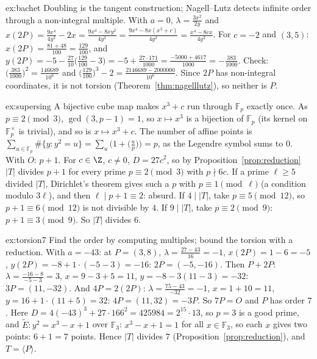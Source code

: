 \begin{solution}{ex:bachet}
\idea Doubling is the tangent construction; Nagell--Lutz detects infinite order through a non-integral multiple.
\writeup With $a=0$, $\lambda=\frac{3x^2}{2y}$ and $x(2P)=\frac{9x^4}{4y^2}-2x=\frac{9x^4-8xy^2}{4y^2}=\frac{9x^4-8x(x^3+c)}{4y^2}=\frac{x^4-8cx}{4y^2}$. For $c=-2$ and $(3,5)$:
$x(2P)=\frac{81+48}{100}=\frac{129}{100}$, and $y(2P)=-5-\frac{27}{10}\bigl(\frac{129}{100}-3\bigr)=-5+\frac{27\cdot171}{1000}=\frac{-5000+4617}{1000}=-\frac{383}{1000}$. Check:
$\bigl(\frac{383}{1000}\bigr)^2=\frac{146689}{10^6}$ and $\bigl(\frac{129}{100}\bigr)^3-2=\frac{2146689-2000000}{10^6}$. Since $2P$ has non-integral coordinates, it is not torsion
(Theorem~\ref{thm:nagelllutz}), so neither is $P$.
\end{solution}

\begin{solution}{ex:supersing}
\idea A bijective cube map makes $x^3+c$ run through $\mathbb F_p$ exactly once.
\writeup As $p\equiv2\pmod3$, $\gcd(3,p-1)=1$, so $x\mapsto x^3$ is a bijection of $\mathbb F_p$ (its kernel on $\mathbb F_p^\times$ is trivial), and so is $x\mapsto x^3+c$.
The number of affine points is $\sum_{u\in\mathbb F_p}\#\{y:y^2=u\}=\sum_u\bigl(1+\bigl(\frac up\bigr)\bigr)=p$, as the Legendre symbol sums to $0$. With $O$: $p+1$. For
$c\in\Z$, $c\ne0$, $D=27c^2$, so by Proposition~\ref{prop:reduction} $|T|$ divides $p+1$ for every prime $p\equiv2\pmod3$ with $p\nmid6c$. If a prime $\ell\ge5$ divided $|T|$, Dirichlet's theorem gives such a
$p$ with $p\equiv1\pmod\ell$ (a condition modulo $3\ell$), and then $\ell\mid p+1\equiv2$: absurd. If $4\mid|T|$, take $p\equiv5\pmod{12}$, so $p+1\equiv6\pmod{12}$ is not divisible by $4$. If $9\mid|T|$, take $p\equiv2\pmod9$:
$p+1\equiv3\pmod9$. So $|T|$ divides $6$.
\end{solution}

\begin{solution}{ex:torsion7}
\idea Find the order by computing multiples; bound the torsion with a reduction.
\writeup With $a=-43$: at $P=(3,8)$, $\lambda=\frac{27-43}{16}=-1$, $x(2P)=1-6=-5$, $y(2P)=-8+1\cdot(-5-3)=-16$: $2P=(-5,-16)$. Then $P+2P$: $\lambda=\frac{-16-8}{-5-3}=3$,
$x=9-3+5=11$, $y=-8-3(11-3)=-32$: $3P=(11,-32)$. And $4P=2(2P)$: $\lambda=\frac{75-43}{-32}=-1$, $x=1+10=11$, $y=16+1\cdot(11+5)=32$: $4P=(11,32)=-3P$. So $7P=O$ and $P$ has
order $7$. Here $D=4(-43)^3+27\cdot166^2=425984=2^{15}\cdot13$, so $p=3$ is a good prime, and $\tilde E:y^2=x^3-x+1$ over $\mathbb F_3$: $x^3-x+1=1$ for all $x\in\mathbb F_3$,
so each $x$ gives two points: $6+1=7$ points. Hence $|T|$ divides $7$ (Proposition~\ref{prop:reduction}), and $T=\langle P\rangle$.
\end{solution}

